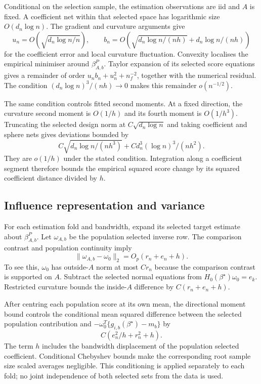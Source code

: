 Conditional on the selection sample, the estimation observations are
iid and $A$ is fixed. A coefficient net within that selected space
has logarithmic size $O(d_n\log n)$. The gradient and curvature
arguments give
\[
 u_n=O\!\left(\sqrt{d_n\log n/n}\right),\qquad
 b_n=O\!\left(\sqrt{d_n\log n/(nh)}+d_n\log n/(nh)\right)
\]
for the coefficient error and local curvature fluctuation.
Convexity localises the empirical minimiser around $\beta_{A,b}^P$.
Taylor expansion of its selected score equations gives a remainder
of order $u_nb_n+u_n^2+n_f^{-2}$, together with the numerical
residual. The condition $(d_n\log n)^3/(nh)\to0$ makes this remainder
$o(n^{-1/2})$.

The same condition controls fitted second moments. At a fixed
direction, the curvature second moment is $O(1/h)$ and its fourth
moment is $O(1/h^3)$. Truncating the selected design norm at
$C\sqrt{d_n\log n}$ and taking coefficient and sphere nets gives
deviations bounded by
\[
 C\sqrt{d_n\log n/(nh^3)}
            +C d_n^3(\log n)^3/(nh^2).
\]
They are $o(1/h)$ under the stated condition. Integration along a
coefficient segment therefore bounds the empirical squared score
change by its squared coefficient distance divided by $h$.

\subsection{Influence representation and variance}

For each estimation fold and bandwidth, expand its selected target
estimate about $\beta_{A,b}^P$. Let $\omega_{A,b}$ be the population
selected inverse row. The comparison contrast and population
continuity imply
\[
 \|\omega_{A,b}-\omega_0\|_2=O_p(r_n+e_n+h).
\]
To see this, $\omega_0$ has outside-$A$ norm at most $Cr_n$ because
the comparison contrast is supported on $A$. Subtract the selected
normal equations from $H_0(\beta^\star)\omega_0=e_k$. Restricted
curvature bounds the inside-$A$ difference by $C(r_n+e_n+h)$.

After centring each population score at its own mean, the directional
moment bound controls the conditional mean squared difference between
the selected population contribution and
$-\omega_0^T\{g_{i,b}(\beta^\star)-m_b\}$ by
\[
 C(e_n^2/h+r_n^2+h).
\]
The term $h$ includes the bandwidth displacement of the population
selected coefficient. Conditional Chebyshev bounds make the
corresponding root sample size scaled averages negligible. This
conditioning is applied separately to each fold; no joint
independence of both selected sets from the data is used.

